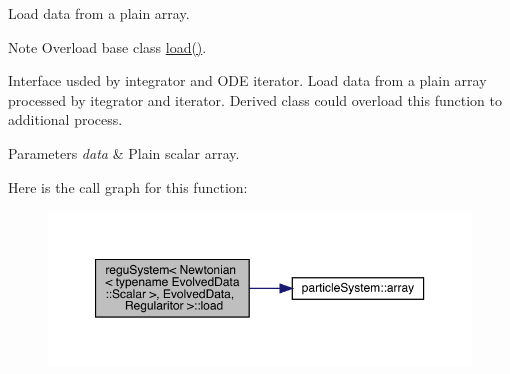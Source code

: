 Load data from a plain array. 

\begin{DoxyNote}{Note}
Overload base class \mbox{\hyperlink{classregu_system_3_01_newtonian_3_01typename_01_evolved_data_1_1_scalar_01_4_00_01_evolved_data_00_01_regularitor_01_4_a968643b9deaa2a579a025652238fdc75}{load()}}.
\end{DoxyNote}
Interface usded by integrator and O\+DE iterator. Load data from a plain array processed by itegrator and iterator. Derived class could overload this function to additional process.


\begin{DoxyParams}{Parameters}
{\em data} & Plain scalar array. \\
\hline
\end{DoxyParams}
Here is the call graph for this function\+:\nopagebreak
\begin{figure}[H]
\begin{center}
\leavevmode
\includegraphics[width=350pt]{classregu_system_3_01_newtonian_3_01typename_01_evolved_data_1_1_scalar_01_4_00_01_evolved_data_00_01_regularitor_01_4_a968643b9deaa2a579a025652238fdc75_cgraph}
\end{center}
\end{figure}
\mbox{\label{classregu_system_3_01_newtonian_3_01typename_01_evolved_data_1_1_scalar_01_4_00_01_evolved_data_00_01_regularitor_01_4_a0cfd66a24e4b23158a6450510c40ab31}} 
